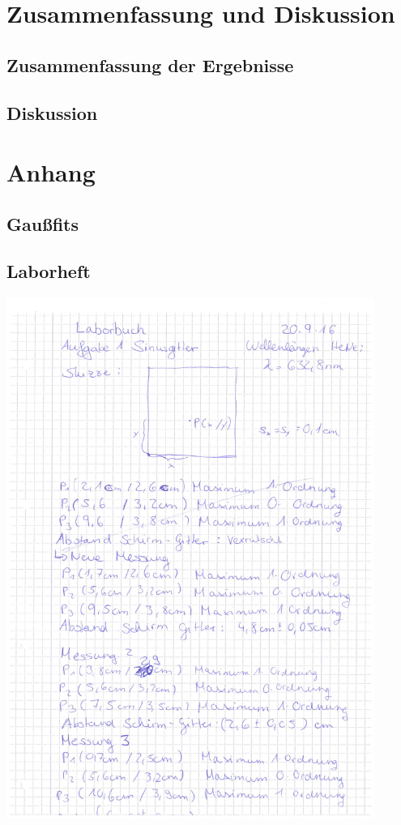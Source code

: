 \documentclass[12pt]{article}
\begin{document}
\newpage
\section{Zusammenfassung und Diskussion}

\subsection{Zusammenfassung der Ergebnisse}



\subsection{Diskussion}


\newpage
\section{Anhang} 
\subsection{Gaußfits}
\label{fitergebnisse}

\subsection{Laborheft\label{Laborheft}} 
\begin{minipage}{\textwidth}
\centering
\includegraphics[width=0.9\textwidth]{figures/Laborbuch2.pdf}
\end{minipage}
\end{document}
